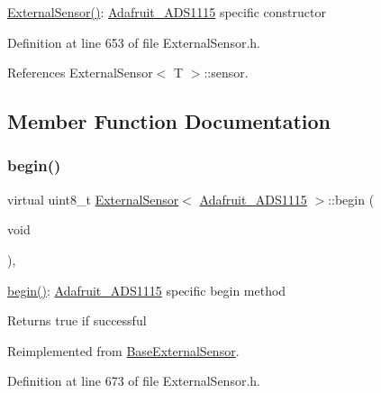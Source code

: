 \hyperlink{class_external_sensor_3_01_adafruit___a_d_s1115_01_4_aff5ed681a7c261462092516a5cc571e1}{External\+Sensor()}\+: \hyperlink{class_adafruit___a_d_s1115}{Adafruit\+\_\+\+A\+D\+S1115} specific constructor 

Definition at line 653 of file External\+Sensor.\+h.



References External\+Sensor$<$ T $>$\+::sensor.



\subsection{Member Function Documentation}
\mbox{\label{class_external_sensor_3_01_adafruit___a_d_s1115_01_4_a208a33108a08459d385b38cb2962376b}} 
\subsubsection{\texorpdfstring{begin()}{begin()}}
{\footnotesize\ttfamily virtual uint8\+\_\+t \hyperlink{class_external_sensor}{External\+Sensor}$<$ \hyperlink{class_adafruit___a_d_s1115}{Adafruit\+\_\+\+A\+D\+S1115} $>$\+::begin (\begin{DoxyParamCaption}\item[{void}]{ }\end{DoxyParamCaption})\hspace{0.3cm}{\ttfamily [inline]}, {\ttfamily [virtual]}}

\hyperlink{class_external_sensor_3_01_adafruit___a_d_s1115_01_4_a208a33108a08459d385b38cb2962376b}{begin()}\+: \hyperlink{class_adafruit___a_d_s1115}{Adafruit\+\_\+\+A\+D\+S1115} specific begin method

\begin{DoxyReturn}{Returns}
true if successful 
\end{DoxyReturn}


Reimplemented from \hyperlink{class_base_external_sensor_a87d132803d4f4fdd4e66332809f0c9a0}{Base\+External\+Sensor}.



Definition at line 673 of file External\+Sensor.\+h.



